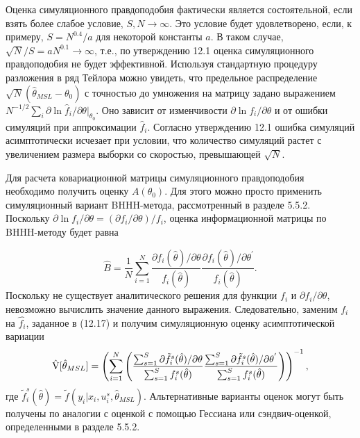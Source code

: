 Оценка симуляционного правдоподобия фактически является состоятельной, если взять более слабое условие, $S,N \rightarrow \infty$. Это условие будет удовлетворено, если, к примеру, $S=N^{0.4}/a$ для некоторой константы $a$. В таком случае, $\sqrt{N}/S=aN^{0.1} \rightarrow \infty$, т.е., по утверждению 12.1 оценка симуляционного правдоподобия не будет эффективной. Используя стандартную процедуру разложения в ряд Тейлора можно увидеть, что предельное распределение $\sqrt{N}(\hat{\theta}_{MSL}-\theta_0)$ с точностью до умножения на матрицу задано выражением $N^{-1/2}\sum_{i}\partial{\ln\hat{f}_i/\partial{\theta}}|_{\theta_0}$. Оно зависит от изменчивости $\partial{\ln{f_i}}/\partial\theta$ и от ошибки симуляций при аппроксимации $\hat{f}_i$. Согласно утверждению 12.1 ошибка симуляций асимптотически исчезает при условии, что количество симуляций растет с увеличением размера выборки со скоростью, превышающей $\sqrt{N}$.

Для расчета ковариационной матрицы симуляционного правдоподобия необходимо получить оценку $A(\theta_0)$. Для этого можно просто применить симуляционный вариант BHHH-метода, рассмотренный в разделе 5.5.2. Поскольку $\partial{\ln{f_i}}/\partial\theta=(\partial{f_i}/\partial\theta)/f_i$, оценка информационной матрицы по BHHH-методу будет равна

\[
\hat{B}=\dfrac{1}{N}\sum^{N}_{i=1}\dfrac{\partial{f_i}(\hat{\theta})/\partial\theta}{f_{i}(\hat{\theta})}\dfrac{\partial{f_i}(\hat{\theta})/\partial\theta^{'}}{f_{i}(\hat{\theta})}.
\]
Поскольку не существует аналитического решения для функции $f_i$ и $\partial{f_i}/\partial\theta$, невозможно вычислить значение данного выражения. Следовательно, заменим $f_i$ на $\hat{f_i}$, заданное в (12.17) и получим симуляционную оценку асимптотической вариации
\begin{equation}
\hat{\mathrm{V}}[\hat{\theta}_{MSL}]=\left( \sum^{N}_{i=1}\left(\dfrac{\sum^{S}_{s=1}\partial\tilde{f}^{s}_{i}(\hat{\theta})/\partial\theta}{\sum^{S}_{s=1}f^{s}_{i}(\hat{\theta})}\dfrac{\sum^{S}_{s=1}\partial\tilde{f}^{s}_{i}(\hat{\theta})/\partial\theta^{'}}{\sum^{S}_{s=1}f^{s}_{i}(\hat{\theta})} \right) \right)^{-1},
\end{equation}
где $\tilde{f}^{s}_{i}(\hat{\theta})=\tilde{f}(y_i|x_i,u^{s}_i,\hat{\theta}_{MSL})$. Альтернативные варианты оценок могут быть получены по аналогии с оценкой с помощью Гессиана или сэндвич-оценкой, определенными в разделе 5.5.2.


